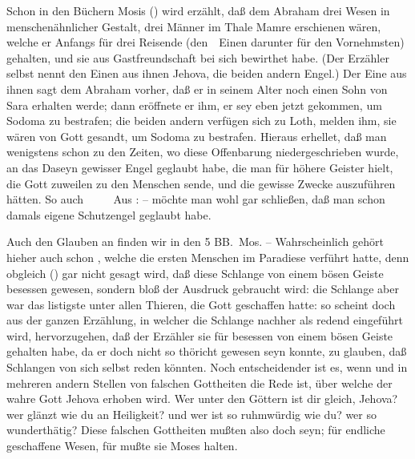 \begin{aufza}
\item Schon in den Büchern Mosis () wird erzählt, daß dem Abraham drei Wesen in menschenähnlicher Gestalt, drei Männer im Thale Mamre erschienen wären, welche er Anfangs für drei Reisende (den~\ Einen darunter für den Vornehmsten) gehalten, und sie aus Gastfreundschaft bei sich bewirthet habe. (Der Erzähler selbst nennt den Einen aus ihnen Jehova, die beiden andern Engel.) Der Eine aus ihnen sagt dem Abraham vorher, daß er in seinem Alter noch einen Sohn von Sara erhalten werde; dann eröffnete er ihm, er sey eben jetzt gekommen, um Sodoma zu bestrafen; die beiden andern verfügen sich zu Loth, melden ihm, sie wären von Gott gesandt, um Sodoma zu bestrafen. Hieraus erhellet, daß man wenigstens schon zu den Zeiten, wo diese Offenbarung niedergeschrieben wurde, an das Daseyn gewisser Engel geglaubt habe, die man für höhere Geister hielt, die Gott zuweilen zu den Menschen sende, und die gewisse Zwecke auszuführen hätten. So auch \ \ \ \  Aus :  -- möchte man wohl gar schließen, daß man schon damals eigene Schutzengel geglaubt habe.
\item Auch den Glauben an  finden wir in den 5 BB.\ Mos. -- Wahrscheinlich gehört hieher auch schon , welche die ersten Menschen im Paradiese verführt hatte, denn obgleich () gar nicht gesagt wird, daß diese Schlange von einem bösen Geiste besessen gewesen, sondern bloß der Ausdruck gebraucht wird: die Schlange aber war das listigste unter allen Thieren, die Gott geschaffen hatte: so scheint doch aus der ganzen Erzählung, in welcher die Schlange nachher als redend eingeführt wird, hervorzugehen, daß der Erzähler sie für besessen von einem bösen Geiste gehalten habe, da er doch nicht so thöricht gewesen seyn konnte, zu glauben, daß Schlangen von sich selbst reden könnten. Noch entscheidender ist es, wenn  und in mehreren andern Stellen von falschen Gottheiten die Rede ist, über welche der wahre Gott Jehova erhoben wird. Wer unter den Göttern ist dir gleich, Jehova? wer glänzt wie du an Heiligkeit? und wer ist so ruhmwürdig wie du? wer so wunderthätig? Diese falschen Gottheiten mußten also doch  seyn; für endliche geschaffene Wesen, für  mußte sie Moses halten.~

\end{aufza}
